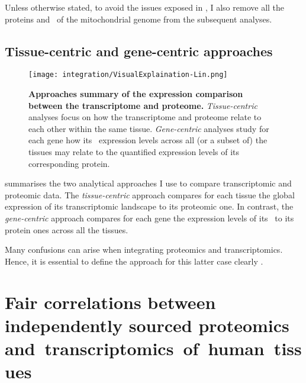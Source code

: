 Unless otherwise stated, to avoid the issues exposed in ,
I also remove all the proteins and \mRNAs\ of the mitochondrial genome
from the subsequent analyses.

\vspace{-3mm}
\subsection{Tissue-centric and gene-centric approaches}
\vspace{-3mm}
\begin{figure}[!htb]
    \texttt{[image: integration/VisualExplaination-Lin.png]}\centering
    \vspace{-3mm}
    \caption[Summary of the expression comparison approaches between
    the transcriptome and proteome]{\label{fig:visualexp}\textbf{Approaches
    summary of the expression comparison between the transcriptome and proteome.}
    \emph{Tissue-centric} analyses focus on
    how the transcriptome and proteome relate to each other within the same tissue.
    \emph{Gene-centric} analyses study for each gene how its \mRNA\ expression
    levels across all (or a subset of) the tissues may relate to
    the quantified expression levels of its corresponding protein.
    }
\end{figure}

 summarises the two analytical approaches I use
to compare transcriptomic and proteomic data.
The \emph{tissue-centric} approach compares for each tissue
the global expression of its transcriptomic landscape to its proteomic one.
In contrast,
the \emph{gene-centric} approach compares for each gene
the expression levels of its \mRNA\ to its protein ones across all the tissues.

\begin{comment}
Although not explicitly indicated,
I use both tissue-centric and gene-centric approaches
in \Cref{ch:Transcriptomics,ch:proteomics}.
The \mRNAs\ studies are equivalent enough and
the proteomic studies so disparate that
global understanding remains unaffected without any precision.

On the other hand,
\end{comment}
Many confusions can arise
when integrating proteomics and transcriptomics.
Hence, it is essential
to define the approach for this latter case clearly .

\section{Fair correlations between independently sourced proteomics~%
and~transcriptomics~of~human~tissues~}\label{subsec:IntegrationGoodCorrProtTrans}

